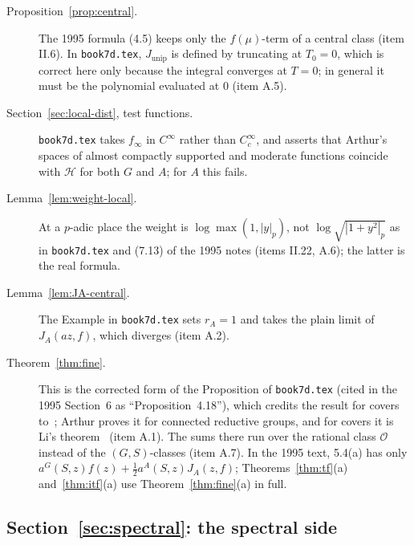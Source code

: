 \begin{description}
\item[Proposition~\ref{prop:central}.] The 1995 formula (4.5) keeps only the $f(\mu)$-term of a central class (item II.6). In \texttt{book7d.tex}, $J_{\mathrm{unip}}$ is defined by truncating at $T_0=0$, which is correct here only because the integral converges at $T=0$; in general it must be the polynomial evaluated at $0$ (item A.5).

\item[Section~\ref{sec:local-dist}, test functions.] \texttt{book7d.tex} takes $f_\infty$ in $C^\infty$ rather than $C_c^\infty$, and asserts that Arthur's spaces of almost compactly supported and moderate functions coincide with $\mathcal H$ for both $G$ and $A$; for $A$ this fails.

\item[Lemma~\ref{lem:weight-local}.] At a $p$-adic place the weight is $\log\max(1,|y|_p)$, not
$\log\sqrt{|1+y^2|_p}$ as in \texttt{book7d.tex} and (7.13) of the 1995
notes (items II.22, A.6); the latter is the real formula.

\item[Lemma~\ref{lem:JA-central}.] The Example in \texttt{book7d.tex} sets $r_A=1$ and takes the plain limit of $J_A(az,f)$, which diverges (item A.2).

\item[Theorem~\ref{thm:fine}.] This is the corrected form of the Proposition of \texttt{book7d.tex} (cited in the 1995 Section~6 as ``Proposition~4.18''), which credits the result for covers to~\cite[Thm.~8.1]{A12}; Arthur proves it for connected reductive groups, and for covers it is Li's theorem~\cite{LiI} (item A.1). The sums there run over the rational class $\mathcal O$ instead of the $(G,S)$-classes (item A.7). In the 1995 text, 5.4(a) has only $a^G(S,z)f(z)+\tfrac12a^A(S,z)J_A(z,f)$; Theorems~\ref{thm:tf}(a) and~\ref{thm:itf}(a) use Theorem~\ref{thm:fine}(a) in full.

\end{description}

\subsection{Section~\ref{sec:spectral}: the spectral side}

